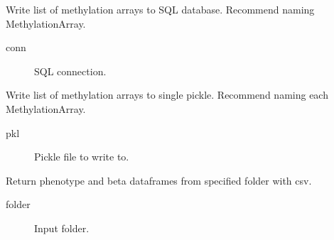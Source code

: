 \documentclass[letterpaper,10pt,english]{sphinxmanual}
\begin{document}
\begin{fulllineitems}
\begin{fulllineitems}
\end{fulllineitems}


\begin{fulllineitems}
\label{\detokenize{index:pymethylprocess.MethylationDataTypes.MethylationArrays.write_dbs}}
Write list of methylation arrays to SQL database. Recommend naming MethylationArray.
\begin{description}
\item[{conn}] \leavevmode
SQL connection.

\end{description}

\end{fulllineitems}


\begin{fulllineitems}
\label{\detokenize{index:pymethylprocess.MethylationDataTypes.MethylationArrays.write_pkls}}
Write list of methylation arrays to single pickle. Recommend naming each MethylationArray.
\begin{description}
\item[{pkl}] \leavevmode
Pickle file to write to.

\end{description}

\end{fulllineitems}


\end{fulllineitems}


\begin{fulllineitems}
\label{\detokenize{index:pymethylprocess.MethylationDataTypes.extract_pheno_beta_df_from_folder}}
Return phenotype and beta dataframes from specified folder with csv.
\begin{description}
\item[{folder}] \leavevmode
Input folder.

\end{description}

\end{fulllineitems}
\end{document}
